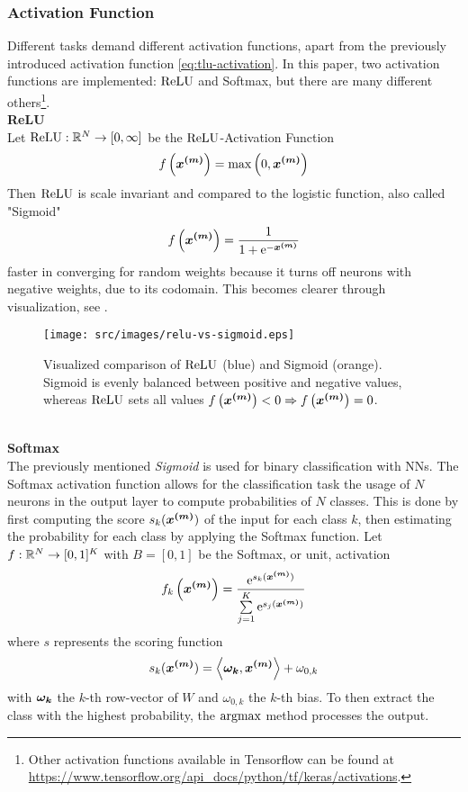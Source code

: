 \subsubsection{Activation Function}
Different tasks demand different activation functions, apart from the previously introduced activation function \eqref{eq:tlu-activation}.
In this paper, two activation functions are implemented: $\operatorname{ReLU}$ and Softmax, but there are many different others\footnote{
    Other activation functions available in Tensorflow can be found at \url{https://www.tensorflow.org/api_docs/python/tf/keras/activations}.
}.\\
\textbf{ReLU}\\
Let $\operatorname{ReLU}: \mathbb{R}^N \rightarrow [0, \infty]$ be the $\operatorname{ReLU}$-Activation Function
\begin{align}
    f\left(\bm{x^{(m)}}\right) = \max\left(0, \bm{x^{(m)}}\right)
    \label{eq:relu}
\end{align}
Then $\operatorname{ReLU}$ is scale invariant and compared to the logistic function, also called "Sigmoid"
\begin{align}
    f\left(\bm{x^{(m)}}\right) = \frac{1}{1+\operatorname{e}^{-\bm{x^{(m)}}}}
    \label{eq:sigmoid}
\end{align}
faster in converging for random weights because it turns off neurons with negative weights, due to its codomain.
This becomes clearer through visualization, see .
\begin{figure}[!ht]
    \centering
    \texttt{[image: src/images/relu-vs-sigmoid.eps]}
    \caption{Visualized comparison of $\operatorname{ReLU}$ (blue) and Sigmoid (orange). Sigmoid is evenly balanced between positive and negative values, whereas $\operatorname{ReLU}$ sets all values $f\left(\bm{x^{(m)}}\right) < 0 \Rightarrow f\left(\bm{x^{(m)}}\right) = 0$.}
    \label{fig:relu-vs-sigmoid}
\end{figure}
\\
\textbf{Softmax}\\
The previously mentioned \textit{Sigmoid} is used for binary classification with NNs.
The Softmax activation function allows for the classification task the usage of $N$ neurons in the output layer to compute probabilities of $N$ classes.
This is done by first computing the score $s_k(\bm{x^{(m)}})$ of the input for each class $k$, then estimating the probability for each class by applying the Softmax function.
Let $f: \mathbb{R}^{N}\rightarrow [0, 1]^{K}$ with $B = [0, 1]$ be the Softmax, or unit, activation
\begin{align}
    f_k\left(\bm{x^{(m)}}\right) = \frac{\operatorname{e}^{s_k(\bm{x^{(m)}})}}{\sum \limits_{j=1}^K\operatorname{e}^{s_j(\bm{x^{(m)}})}}
    \label{eq:softmax}
\end{align}
where $s$ represents the scoring function
\begin{align}
    s_k(\bm{x^{(m)}}) = \left\langle\bm{\omega_k}, \bm{x^{(m)}}\right\rangle + \omega_{0,k}
\end{align}
with $\bm{\omega_k}$ the $k$-th row-vector of $W$ and $\omega_{0,k}$ the $k$-th bias.
To then extract the class with the highest probability, the $\operatorname*{argmax}$ method processes the output.

